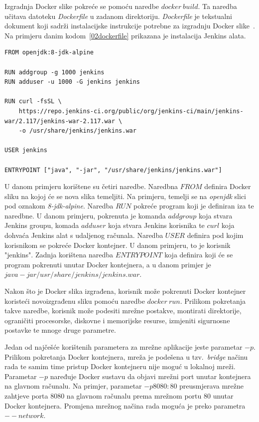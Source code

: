Izgradnja Docker slike pokreće se pomoću naredbe $docker~build$. Ta naredba učitava datoteku
\textit{Dockerfile} u zadanom direktoriju. \textit{Dockerfile} je tekstualni dokument koji sadrži
instalacijske instrukcije potrebne za izgradnju Docker slike~\citep{kacamarga2015lightweight}.
Na primjeru danim kodom~\ref{02dockerfile} prikazana je instalacija Jenkins alata.

\begin{lstlisting}[float=h]
FROM openjdk:8-jdk-alpine

RUN addgroup -g 1000 jenkins
RUN adduser -u 1000 -G jenkins jenkins

RUN curl -fsSL \
    https://repo.jenkins-ci.org/public/org/jenkins-ci/main/jenkins-war/2.117/jenkins-war-2.117.war \
    -o /usr/share/jenkins/jenkins.war

USER jenkins

ENTRYPOINT ["java", "-jar", "/usr/share/jenkins/jenkins.war"]
\end{lstlisting}

U danom primjeru korištene su četiri naredbe. Naredbna $FROM$ definira Docker sliku na kojoj će se
nova slika temeljiti. Na primjeru, temelji se na \textit{openjdk} slici pod oznakom
\textit{8-jdk-alpine}. Naredba $RUN$ pokreće program koji je definiran iza te naredbne. U danom
primjeru, pokrenuta je komanda $addgroup$ koja stvara Jenkins groupu, komada $adduser$ koja stvara
Jenkins korisnika te $curl$ koja dohvaća Jenkins alat s udaljenog računala.
Naredba $USER$ definira pod kojim korisnikom se pokreće Docker kontejner. U danom primjeru, to je
korisnik "jenkins". Zadnja korištena naredba $ENTRYPOINT$ koja definira koji će se program pokrenuti
unutar Docker kontejnera, a u danom primjer je $java -jar /usr/share/jenkins/jenkins.war$.

Nakon što je Docker slika izgrađena, korisnik može pokrenuti Docker kontejner koristeći
novoizgrađenu sliku pomoću naredbe $docker~run$. Prilikom pokretanja takve naredbe, korisnik može
podesiti mrežne postakve, montirati direktorije, ograničiti procesorske, diskovne i memorijske
resurse, izmjeniti sigurnosne postavke te mnoge druge parametre.

Jedan od najčešće korištenih parametera za mrežne aplikacije jeste parametar $-p$. Prilikom
pokretanja Docker kontejnera, mreža je podešena u tzv.~\textit{bridge} načinu rada te samim time
pristup Docker kontejneru nije moguć u lokalnoj mreži. Parametar $-p$ naređuje Docker sustavu
da objavi mrežni port unutar kontejnera na glavnom računalu. Na primjer, parametar $-p 8080:80$
preusmjerava mrežne zahtjeve porta 8080 na glavnom računalu prema mrežnom portu 80 unutar Docker
kontejnera. Promjena mrežnog načina rada moguća je preko parametra $--network$.

